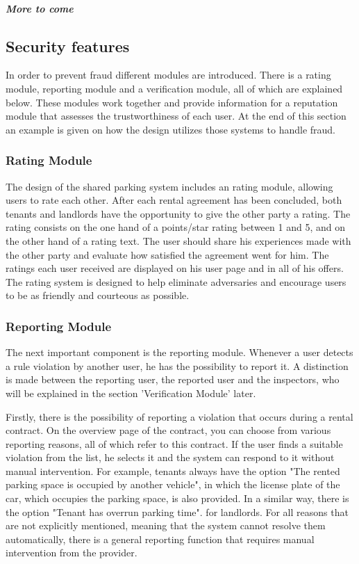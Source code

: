 \documentclass[
a4paper,     %
titlepage,   %
14pt         %
]{scrartcl}  %
\theoremstyle{mystyle}
\begin{document}
\subparagraph{More to come}
  
\subsection{Security features}
In order to prevent fraud different modules are introduced. There is a rating module, reporting module and a verification module, all of which are explained below. These modules work together and provide information for a reputation module that assesses the trustworthiness of each user. At the end of this section an example is given on how the design utilizes those systems to handle fraud.

\subsubsection{Rating Module} The design of the shared parking system includes an rating module, allowing users to rate each other. After each rental agreement has been concluded, both tenants and landlords have the opportunity to give the other party a rating. The rating consists on the one hand of a points/star rating between 1 and 5, and on the other hand of a rating text. The user should share his experiences made with the other party and evaluate how satisfied the agreement went for him. The ratings each user received are displayed on his user page and in all of his offers. The rating system is designed to help eliminate adversaries and encourage users to be as friendly and courteous as possible.

\subsubsection{Reporting Module} The next important component is the reporting module. Whenever a user detects a rule violation by another user, he has the possibility to report it. A distinction is made between the reporting user, the reported user and the inspectors, who will be explained in the section 'Verification Module' later.

Firstly, there is the possibility of reporting a violation that occurs during a rental contract. On the overview page of the contract, you can choose from various reporting reasons, all of which refer to this contract. If the user finds a suitable violation from the list, he selects it and the system can respond to it without manual intervention. For example, tenants always have the option "The rented parking space is occupied by another vehicle", in which the license plate of the car, which occupies the parking space, is also provided. In a similar way, there is the option "Tenant has overrun parking time". for landlords. For all reasons that are not explicitly mentioned, meaning that the system cannot resolve them automatically, there is a general reporting function that requires manual intervention from the provider.
\end{document}
